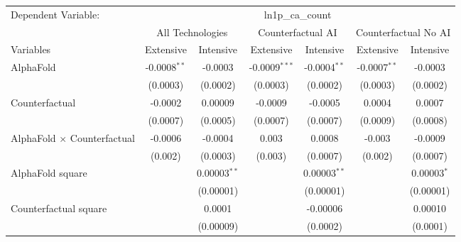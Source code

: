 \begingroup
\centering
\begin{tabular}{lcccccc}
   \tabularnewline \midrule \midrule
   Dependent Variable: & \multicolumn{6}{c}{ln1p\_ca\_count}\\
 & \multicolumn{2}{c}{All Technologies} & \multicolumn{2}{c}{Counterfactual AI} & \multicolumn{2}{c}{Counterfactual No AI} \\
\cmidrule(lr){1-1}\cmidrule(lr){2-3} \cmidrule(lr){4-5} \cmidrule(lr){6-7}
Variables & \multicolumn{1}{c}{Extensive} & \multicolumn{1}{c}{Intensive} & \multicolumn{1}{c}{Extensive} & \multicolumn{1}{c}{Intensive} & \multicolumn{1}{c}{Extensive} & \multicolumn{1}{c}{Intensive} \\
\cmidrule(lr){1-1}\cmidrule(lr){2-2} \cmidrule(lr){3-3} \cmidrule(lr){4-4} \cmidrule(lr){5-5} \cmidrule(lr){6-6} \cmidrule(lr){7-7}
   AlphaFold                          & -0.0008$^{**}$ & -0.0003        & -0.0009$^{***}$ & -0.0004$^{**}$ & -0.0007$^{**}$ & -0.0003\\   
                                      & (0.0003)       & (0.0002)       & (0.0003)        & (0.0002)       & (0.0003)       & (0.0002)\\   
   Counterfactual                     & -0.0002        & 0.00009        & -0.0009         & -0.0005        & 0.0004         & 0.0007\\   
                                      & (0.0007)       & (0.0005)       & (0.0007)        & (0.0007)       & (0.0009)       & (0.0008)\\   
   AlphaFold $\times$ Counterfactual  & -0.0006        & -0.0004        & 0.003           & 0.0008         & -0.003         & -0.0009\\   
                                      & (0.002)        & (0.0003)       & (0.003)         & (0.0007)       & (0.002)        & (0.0007)\\   
   AlphaFold square                   &                & 0.00003$^{**}$ &                 & 0.00003$^{**}$ &                & 0.00003$^{*}$\\   
                                      &                & (0.00001)      &                 & (0.00001)      &                & (0.00001)\\   
   Counterfactual square              &                & 0.0001         &                 & -0.00006       &                & 0.00010\\   
                                      &                & (0.00009)      &                 & (0.0002)       &                & (0.0001)\\   

\end{tabular}
